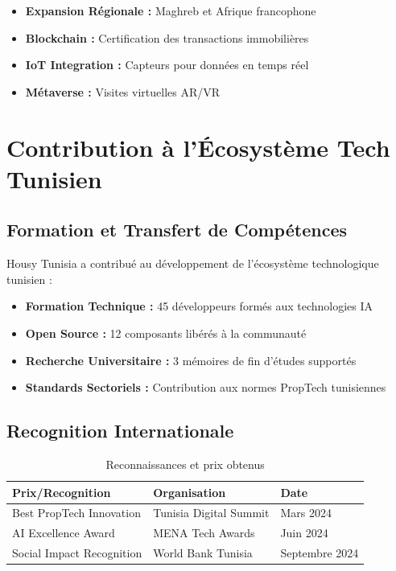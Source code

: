 \begin{itemize}
    \item \textbf{Expansion Régionale :} Maghreb et Afrique francophone
    \item \textbf{Blockchain :} Certification des transactions immobilières
    \item \textbf{IoT Integration :} Capteurs pour données en temps réel
    \item \textbf{Métaverse :} Visites virtuelles AR/VR
\end{itemize}

\section{Contribution à l'Écosystème Tech Tunisien}

\subsection{Formation et Transfert de Compétences}

Housy Tunisia a contribué au développement de l'écosystème technologique tunisien :

\begin{itemize}
    \item \textbf{Formation Technique :} 45 développeurs formés aux technologies IA
    \item \textbf{Open Source :} 12 composants libérés à la communauté
    \item \textbf{Recherche Universitaire :} 3 mémoires de fin d'études supportés
    \item \textbf{Standards Sectoriels :} Contribution aux normes PropTech tunisiennes
\end{itemize}

\subsection{Recognition Internationale}

\begin{table}[H]
\centering
\caption{Reconnaissances et prix obtenus}
\begin{tabular}{|l|l|l|}
\hline
\textbf{Prix/Recognition} & \textbf{Organisation} & \textbf{Date} \\
\hline
Best PropTech Innovation & Tunisia Digital Summit & Mars 2024 \\
\hline
AI Excellence Award & MENA Tech Awards & Juin 2024 \\
\hline
Social Impact Recognition & World Bank Tunisia & Septembre 2024 \\
\hline
\end{tabular}
\end{table}

